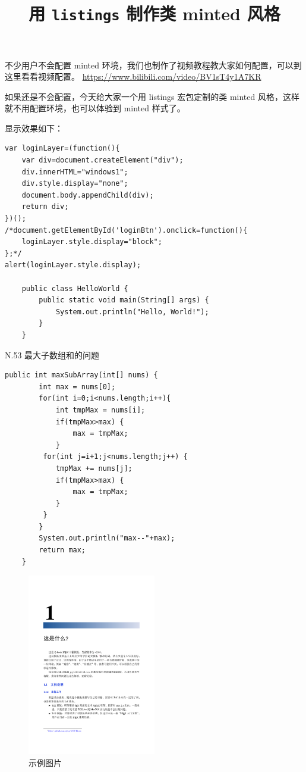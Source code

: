 \documentclass[10pt]{ctexart}
\begin{document}
\title{用  \texttt{listings} 制作类 minted 风格}

\maketitle

不少用户不会配置 minted 环境，我们也制作了视频教程教大家如何配置，可以到这里看看视频配置。
\url{https://www.bilibili.com/video/BV1sT4y1A7KR}


如果还是不会配置，今天给大家一个用
listings 宏包定制的类 minted 风格，这样就不用配置环境，也可以体验到 minted 样式了。



显示效果如下：
\begin{lstlisting}
var loginLayer=(function(){
    var div=document.createElement("div");
    div.innerHTML="windows1";
    div.style.display="none";
    document.body.appendChild(div);
    return div;
})();
/*document.getElementById('loginBtn').onclick=function(){
    loginLayer.style.display="block";
};*/
alert(loginLayer.style.display);

    public class HelloWorld {
        public static void main(String[] args) {
            System.out.println("Hello, World!");
        }
    }
\end{lstlisting}

\newpage
N.53 最大子数组和的问题
\begin{lstlisting}
public int maxSubArray(int[] nums) {
        int max = nums[0];
        for(int i=0;i<nums.length;i++){
            int tmpMax = nums[i];
            if(tmpMax>max) {
                max = tmpMax;
            }
         for(int j=i+1;j<nums.length;j++) {
            tmpMax += nums[j];
            if(tmpMax>max) {
                max = tmpMax;
            }
         }
        }
        System.out.println("max--"+max);
        return max;
    }
\end{lstlisting}



\newpage
\begin{figure}
    \centering
    \includegraphics[width=0.5\textwidth]{9.png} %
    \caption{示例图片}
    \label{fig:example}
\end{figure}
\end{document}
